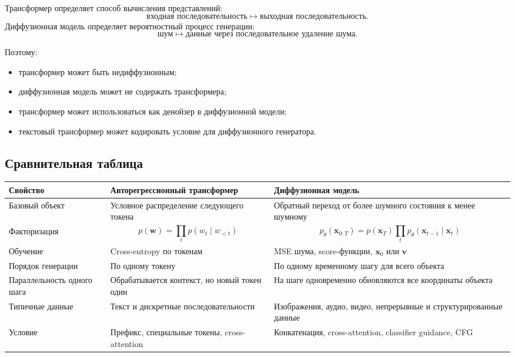 \documentclass[12pt,a4paper]{article}
\theoremstyle{definition}
\newcommand{\1}{\mathbf{1}}
\begin{document}
Трансформер определяет способ вычисления представлений:
\[
    \text{входная последовательность}
    \longmapsto
    \text{выходная последовательность}.
\]
Диффузионная модель определяет вероятностный процесс генерации:
\[
    \text{шум}
    \longmapsto
    \text{данные через последовательное удаление шума}.
\]

Поэтому:
\begin{itemize}
    \item трансформер может быть недиффузионным;
    \item диффузионная модель может не содержать трансформера;
    \item трансформер может использоваться как денойзер в
    диффузионной модели;
    \item текстовый трансформер может кодировать условие для
    диффузионного генератора.
\end{itemize}

\subsection{Сравнительная таблица}

\begin{center}
\begin{tabular}{p{}p{}p{}}
\toprule
\textbf{Свойство} &
\textbf{Авторегрессионный трансформер} &
\textbf{Диффузионная модель}\\
\midrule
Базовый объект &
Условное распределение следующего токена &
Обратный переход от более шумного состояния к менее шумному\\
\addlinespace
Факторизация &
\[
    p(\bm{w})
    =
    \prod_t p(w_t\mid w_{<t})
\]
&
\[
    p_\theta(\bm{x}_{0:T})
    =
    p(\bm{x}_T)
    \prod_t p_\theta(\bm{x}_{t-1}\mid\bm{x}_t)
\]\\
\addlinespace
Обучение &
Cross-entropy по токенам &
MSE шума, score-функции, $\bm{x}_0$ или $\bm{v}$\\
\addlinespace
Порядок генерации &
По одному токену &
По одному временному шагу для всего объекта\\
\addlinespace
Параллельность одного шага &
Обрабатывается контекст, но новый токен один &
На шаге одновременно обновляются все координаты объекта\\
\addlinespace
Типичные данные &
Текст и дискретные последовательности &
Изображения, аудио, видео, непрерывные и структурированные данные\\
\addlinespace
Условие &
Префикс, специальные токены, cross-attention &
Конкатенация, cross-attention, classifier guidance, CFG\\
\bottomrule
\end{tabular}
\end{center}
\end{document}
